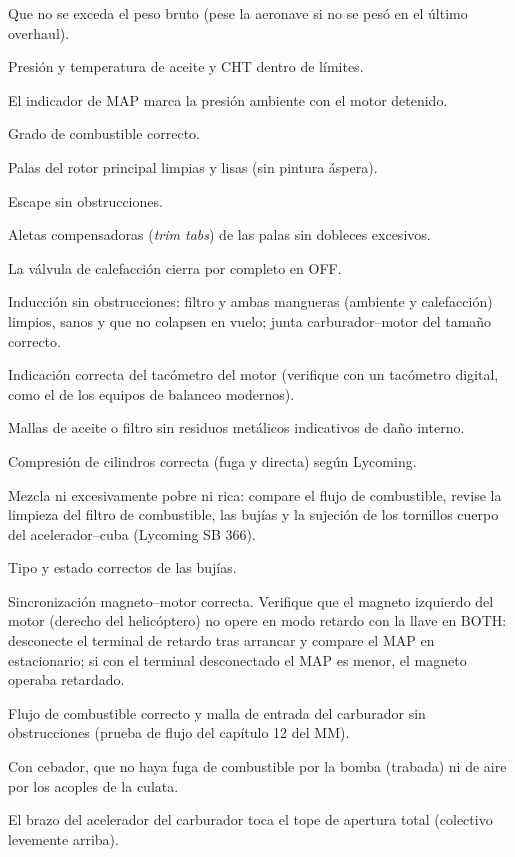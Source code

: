 \begin{pasos}
\item Que no se exceda el peso bruto (pese la aeronave si no se pesó en el último overhaul).
\item Presión y temperatura de aceite y CHT dentro de límites.
\item El indicador de MAP marca la presión ambiente con el motor detenido.
\item Grado de combustible correcto.
\item Palas del rotor principal limpias y lisas (sin pintura áspera).
\item Escape sin obstrucciones.
\item Aletas compensadoras (\emph{trim tabs}) de las palas sin dobleces excesivos.
\item La válvula de calefacción cierra por completo en OFF.
\item Inducción sin obstrucciones: filtro y ambas mangueras (ambiente y calefacción) limpios, sanos y que no colapsen en vuelo; junta carburador--motor del tamaño correcto.
\item Indicación correcta del tacómetro del motor (verifique con un tacómetro digital, como el de los equipos de balanceo modernos).
\item Mallas de aceite o filtro sin residuos metálicos indicativos de daño interno.
\item Compresión de cilindros correcta (fuga y directa) según Lycoming.
\item Mezcla ni excesivamente pobre ni rica: compare el flujo de combustible, revise la limpieza del filtro de combustible, las bujías y la sujeción de los tornillos cuerpo del acelerador--cuba (Lycoming SB 366).
\item Tipo y estado correctos de las bujías.
\item Sincronización magneto--motor correcta. Verifique que el magneto izquierdo del motor (derecho del helicóptero) no opere en modo retardo con la llave en BOTH: desconecte el terminal de retardo tras arrancar y compare el MAP en estacionario; si con el terminal desconectado el MAP es menor, el magneto operaba retardado.
\item Flujo de combustible correcto y malla de entrada del carburador sin obstrucciones (prueba de flujo del capítulo 12 del MM).
\item Con cebador, que no haya fuga de combustible por la bomba (trabada) ni de aire por los acoples de la culata.
\item El brazo del acelerador del carburador toca el tope de apertura total (colectivo levemente arriba).

\end{pasos}
